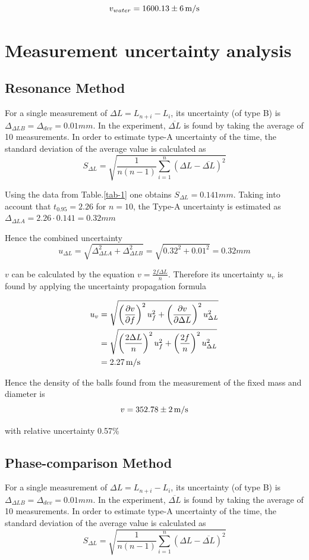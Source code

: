 \documentclass{article}
\begin{document}
$$v_{water}=1600.13\pm6\,\rm{m/s}$$


\newpage

\section{Measurement uncertainty analysis}

\subsection{Resonance Method}
For a single measurement of $\Delta L=L_{n+i}-L_i$, its uncertainty (of
type B) is $\Delta_{\Delta LB}=\Delta_{dev}=0.01mm$. In the experiment, $\overline{\Delta L}$ is found by 
taking the average of 10 measurements. In order to estimate type-A uncertainty of the time, the standard deviation of the average value is calculated as
$$S_{\Delta L}=\sqrt{\frac{1}{n(n-1)}\sum_{i=1}^n(\Delta L-\overline{\Delta L}{})^2}$$

Using the data from Table.\ref{tab-1} one obtains $S_{\Delta L}=0.141mm$. Taking into account that $t_{0.95}=2.26$ for $n=10$, the Type-A uncertainty is estimated as $\Delta_{\Delta L A}=2.26\cdot0.141=0.32mm$

Hence the combined uncertainty
$$u_{\Delta L}=\sqrt{\Delta^2_{\Delta L A}+\Delta^2_{\Delta L B}}=\sqrt{0.32^2+0.01^2}=0.32mm$$

$v$ can be calculated by the equation $v=\frac{2f\Delta L}{n}$. Therefore its uncertainty $u_{v}$ is found by applying the uncertainty propagation formula

\begin{align*}
u_v&=\sqrt{\left(\frac{\partial v}{\partial f}\right)^2u_f^2+\left(\frac{\partial v}{\partial \Delta L}\right)^2u_{\Delta L}^2}\\
&=\sqrt{\left(\frac{2\Delta L}{n}\right)^2u_f^2+\left(\frac{2f}{n}\right)^2u_{\Delta L}^2}\\
&=2.27\,\rm{m/s}
\end{align*}

Hence the density of the balls found from the measurement of the fixed mass and diameter is
$$v=352.78\pm2\,\rm{m/s}$$

with relative uncertainty 0.57\%

\subsection{Phase-comparison Method}

For a single measurement of $\Delta L=L_{n+i}-L_i$, its uncertainty (of
type B) is $\Delta_{\Delta LB}=\Delta_{dev}=0.01mm$. In the experiment, $\overline{\Delta L}$ is found by 
taking the average of 10 measurements. In order to estimate type-A uncertainty of the time, the standard deviation of the average value is calculated as
$$S_{\Delta L}=\sqrt{\frac{1}{n(n-1)}\sum_{i=1}^n(\Delta L-\overline{\Delta L}{})^2}$$
\end{document}

